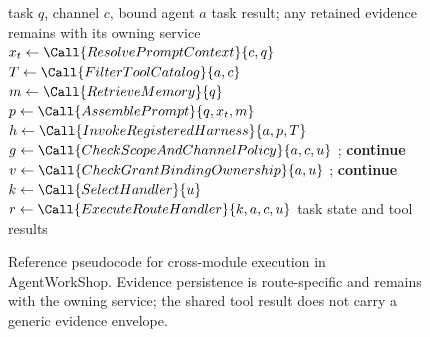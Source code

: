 \begin{figure}[!t]
\centering
\begin{algorithmic}[1]
\Require task $q$, channel $c$, bound agent $a$
\Ensure task result; any retained evidence remains with its owning service
\State $x_t \gets \Call{ResolvePromptContext}{c,q}$
\State $T \gets \Call{FilterToolCatalog}{a,c}$
\State $m \gets \Call{RetrieveMemory}{q}$
\State $p \gets \Call{AssemblePrompt}{q,x_t,m}$
\State $h \gets \Call{InvokeRegisteredHarness}{a,p,T}$
  \State $g \gets \Call{CheckScopeAndChannelPolicy}{a,c,u}$
    \State {}; \textbf{continue}
  \EndIf
    \State $v \gets \Call{CheckGrantBindingOwnership}{a,u}$
      \State {}; \textbf{continue}
    \EndIf
  \EndIf
  \State $k \gets \Call{SelectHandler}{u}$
  \State $r \gets \Call{ExecuteRouteHandler}{k,a,c,u}$
  \State {}
\EndFor
\State \Return task state and tool results
\end{algorithmic}
\caption{Reference pseudocode for cross-module execution in AgentWorkShop.
Evidence persistence is route-specific and remains with the owning service;
the shared tool result does not carry a generic evidence envelope.}
\label{fig:execution}
\end{figure}
